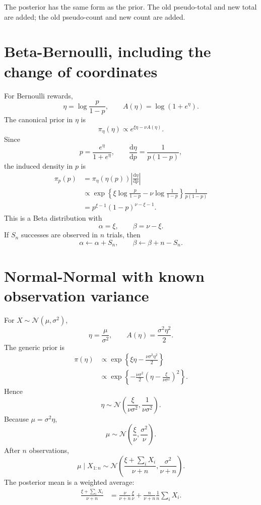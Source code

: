 \documentclass[en,nofont,11pt]{elegantbook}
\newcommand{\Normal}{\mathcal{N}}
\newcommand{\dd}{\mathrm{d}}
\begin{document}
The posterior has the same form as the prior. The old pseudo-total and new total are added; the old pseudo-count and new count are added.

\section{Beta-Bernoulli, including the change of coordinates}

For Bernoulli rewards,
\[
\eta=\log\frac{p}{1-p},
\qquad
A(\eta)=\log(1+e^\eta).
\]
The canonical prior in $\eta$ is
\[
\pi_\eta(\eta)\propto e^{\xi\eta-\nu A(\eta)}.
\]
Since
\[
p=\frac{e^\eta}{1+e^\eta},
\qquad
\frac{\dd\eta}{\dd p}=\frac{1}{p(1-p)},
\]
the induced density in $p$ is
\begin{align*}
\pi_p(p)
&=\pi_\eta(\eta(p))\left|\frac{\dd\eta}{\dd p}\right|\\
&\propto
\exp\left\{\xi\log\frac{p}{1-p}-\nu\log\frac{1}{1-p}\right\}
\frac{1}{p(1-p)}\\
&=p^{\xi-1}(1-p)^{\nu-\xi-1}.
\end{align*}
This is a Beta distribution with
\[
\alpha=\xi,
\qquad
\beta=\nu-\xi.
\]
If $S_n$ successes are observed in $n$ trials, then
\[
\alpha\leftarrow\alpha+S_n,
\qquad
\beta\leftarrow\beta+n-S_n.
\]

\section{Normal-Normal with known observation variance}

For $X\sim\Normal(\mu,\sigma^2)$,
\[
\eta=\frac{\mu}{\sigma^2},
\qquad
A(\eta)=\frac{\sigma^2\eta^2}{2}.
\]
The generic prior is
\begin{align*}
\pi(\eta)
&\propto
\exp\left\{\xi\eta-\frac{\nu\sigma^2\eta^2}{2}\right\}\\
&\propto
\exp\left\{-\frac{\nu\sigma^2}{2}
\left(\eta-\frac{\xi}{\nu\sigma^2}\right)^2\right\}.
\end{align*}
Hence
\[
\eta\sim\Normal\left(\frac{\xi}{\nu\sigma^2},\frac{1}{\nu\sigma^2}\right).
\]
Because $\mu=\sigma^2\eta$,
\[
\mu\sim\Normal\left(\frac{\xi}{\nu},\frac{\sigma^2}{\nu}\right).
\]
After $n$ observations,
\[
\mu\mid X_{1:n}
\sim
\Normal\left(
\frac{\xi+\sum_iX_i}{\nu+n},
\frac{\sigma^2}{\nu+n}
\right).
\]
The posterior mean is a weighted average:
\begin{align*}
\frac{\xi+\sum_iX_i}{\nu+n}
&=
\frac{\nu}{\nu+n}\frac{\xi}{\nu}
+
\frac{n}{\nu+n}\frac{1}{n}\sum_iX_i.
\end{align*}
\end{document}
